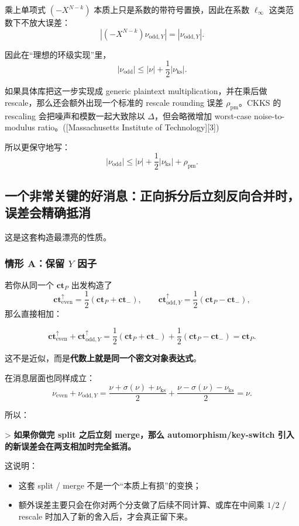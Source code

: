 \documentclass{article}
\newcommand{\ct}{\mathbf{ct}}
\begin{document}
乘上单项式 \((-X^{N-k})\) 本质上只是系数的带符号置换，因此在系数 \(\ell_\infty\) 这类范数下不放大误差：
\[
|(-X^{N-k})\nu_{\mathrm{odd},Y}| = |\nu_{\mathrm{odd},Y}|.
\]

因此在“理想的环级实现”里，
\[
|\nu_{\mathrm{odd}}| \le |\nu|+\frac12|\nu_{\mathrm{ks}}|.
\]

如果具体库把这一步实现成 generic plaintext multiplication，并在乘后做 rescale，那么还会额外出现一个标准的 rescale rounding 误差 \(\rho_{\mathrm{pm}}\)。CKKS 的 rescaling 会把噪声和模数一起大致除以 \(\Delta\)，但会略微增加 worst-case noise-to-modulus ratio。([Massachusetts Institute of Technology][3])

所以更保守地写：
\[
|\nu_{\mathrm{odd}}| \le |\nu|+\frac12|\nu_{\mathrm{ks}}|+\rho_{\mathrm{pm}}.
\]

\subsection{一个非常关键的好消息：正向拆分后立刻反向合并时，误差会精确抵消}

这是这套构造最漂亮的性质。

\subsubsection{情形 A：保留 \(Y\) 因子}

若你从同一个 \(\ct_P\) 出发构造了
\[
\ct_{\mathrm{even}}^{\uparrow} = \frac12(\ct_P+\ct_{-}), \qquad
\ct_{\mathrm{odd},Y}^{\uparrow} = \frac12(\ct_P-\ct_{-}),
\]
那么直接相加：

\[
\ct_{\mathrm{even}}^{\uparrow} + \ct_{\mathrm{odd},Y}^{\uparrow}
= \frac12(\ct_P+\ct_{-}) + \frac12(\ct_P-\ct_{-}) = \ct_P.
\]

这不是近似，而是\textbf{代数上就是同一个密文对象表达式}。

在消息层面也同样成立：
\[
\nu_{\mathrm{even}}+\nu_{\mathrm{odd},Y}
= \frac{\nu+\sigma(\nu)+\nu_{\mathrm{ks}}}{2} + \frac{\nu-\sigma(\nu)-\nu_{\mathrm{ks}}}{2} = \nu.
\]

所以：

> \textbf{如果你做完 split 之后立刻 merge，那么 automorphism/key-switch 引入的新误差会在两支相加时完全抵消。}

这说明：

\begin{itemize}
    \item 这套 split / merge 不是一个“本质上有损”的变换；
    \item 额外误差主要只会在你对两个分支做了后续不同计算、或库在中间乘 \(1/2\) / rescale 时加入了新的舍入后，才会真正留下来。
\end{itemize}
\end{document}
